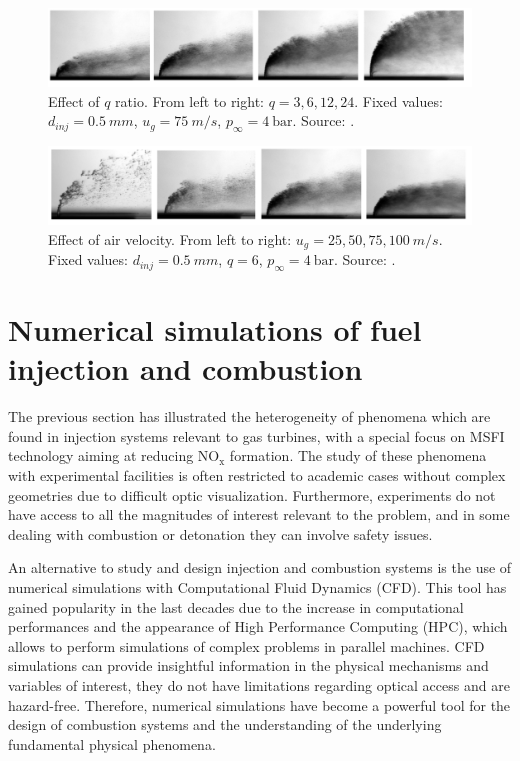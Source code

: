 \begin{figure}[h!]
	\centering
	\includegraphics[scale=0.45]{./part0_intro/parametric_JICF_q_ratio}
	\caption{Effect of $q$ ratio. From left to right: $q = 3, 6, 12, 24$. Fixed values: $d_{inj} = 0.5 ~mm$, $u_g = 75 ~m/s$, $p_\infty = 4 ~\mathrm{bar}$. Source: .}
	\label{fig:parametric_JICF_q_ratio}
\end{figure}

\begin{figure}[h!]
	\centering
	\includegraphics[scale=0.45]{./part0_intro/parametric_JICF_air_velocity}
	\caption{Effect of air velocity. From left to right: $u_g = 25, 50, 75, 100 ~m/s$. Fixed values: $d_{inj} = 0.5 ~mm$, $q = 6$, $p_\infty = 4 ~\mathrm{bar}$. Source: .}
	\label{fig:parametric_JICF_air_velocity}
\end{figure}


\section{Numerical simulations of fuel injection and combustion }

The previous section has illustrated the heterogeneity of phenomena which are found in injection systems relevant to gas turbines, with a special focus on MSFI technology aiming at reducing NO$_\mathrm{x}$ formation. The study of these phenomena with experimental facilities is often restricted to academic cases without complex geometries due to difficult optic visualization. Furthermore, experiments do not have access to all the magnitudes of interest relevant to the problem, and in some dealing with combustion or detonation they can involve safety issues.

An alternative to study and design injection and combustion systems is the use of numerical simulations with Computational Fluid Dynamics (CFD). This tool has gained popularity in the last decades due to the increase in computational performances and the appearance of High Performance Computing (HPC), which allows to perform simulations of complex problems in parallel machines. CFD simulations can provide insightful information in the physical mechanisms and variables of interest, they do not have limitations regarding optical access and are hazard-free. Therefore, numerical simulations have become a powerful tool for the design of combustion systems and the understanding of the underlying fundamental physical phenomena.


